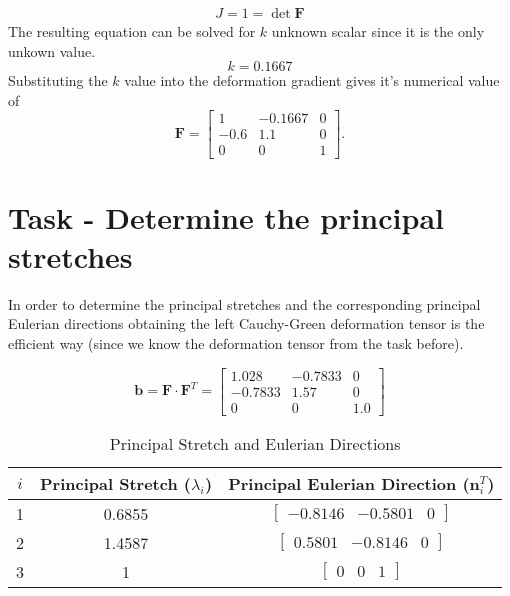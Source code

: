 \documentclass[12pt]{article}
\begin{document}
\begin{gather}
  J = 1 = \det \textbf{F}
\end{gather}
The resulting equation can be solved for $k$ unknown scalar since it is the only unkown value.
\begin{equation}
  k = 0.1667
\end{equation}
Substituting the $k$ value into the deformation gradient gives it's numerical value of
\begin{equation}
  \textbf{F} = \displaystyle \left[\begin{matrix}1 & -0.1667 & 0\\-0.6 & 1.1 & 0\\0 & 0 & 1\end{matrix}\right].
\end{equation}

\section{Task - Determine the principal stretches}
In order to determine the principal stretches and the corresponding principal Eulerian directions obtaining the left Cauchy-Green deformation tensor is the efficient way (since we know the deformation tensor from the task before).

\begin{equation}
  \textbf{b} = \textbf{F} \cdot \textbf{F}^T = \displaystyle \left[\begin{matrix}1.028 & -0.7833 & 0\\-0.7833 & 1.57 & 0\\0 & 0 & 1.0\end{matrix}\right]
\end{equation}

\begin{table}[htbp]
  \centering
  \renewcommand{\arraystretch}{1.1} %
  \caption{Principal Stretch and Eulerian Directions}
  \label{tab:eig}
  \begin{tabular}{ccc}
      $i$ & Principal Stretch ($\lambda_i$) & Principal Eulerian Direction ($\textbf{n}_i ^T$) \\ \hline
      1 & 0.6855 & $\begin{bmatrix}
        -0.8146 & -0.5801 & 0
      \end{bmatrix}$\\[0.1 cm]
      2 & 1.4587 & $\begin{bmatrix}
        0.5801 & -0.8146 & 0
      \end{bmatrix}$\\[0.1 cm]
      3 & 1 & $\begin{bmatrix}
        0 & 0 & 1
      \end{bmatrix}$\\
  \end{tabular}
\end{table}
\end{document}
